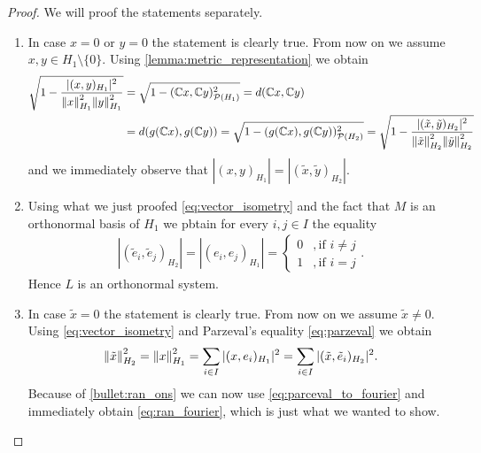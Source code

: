 \begin{proof}
	We will proof the statements separately.
	\begin{enumerate}
		\item In case $x = 0$ or $y = 0$ the statement is clearly true. From now on we assume $x,y \in H_1 \setminus \{0\}$. Using \ref{lemma:metric_representation} we obtain
		\begin{align*}
			\sqrt{1 - \dfrac{|(x,y)_{H_1}|^2}{\norm[H_1]{x}^2 \norm[H_1]{y}^2}} &= \sqrt{1 - (\C x,\C y)_{\mathcal{P}(H_1)}^2} = d(\C x,\C y) \\
			&= d\pbraces{g(\C x), g(\C y)} = \sqrt{1 - (g(\C x), g(\C y))_{\mathcal{P}(H_2)}^2} = \sqrt{1 - \dfrac{|(\tilde{x}, \tilde{y})_{H_2}|^2}{\norm[H_2]{\tilde{x}}^2 \norm[H_2]{\tilde{y}}^2}}
		\end{align*}
		and we immediately observe that $|(x,y)_{H_1}| = |(\tilde{x},\tilde{y})_{H_2}|$. 
		
		\item Using what we just proofed \eqref{eq:vector_isometry} and the fact that $M$ is an orthonormal basis of $H_1$ we pbtain for every $i,j \in I$ the equality
		\begin{align*}
			|(\tilde{e}_i, \tilde{e}_j)_{H_2}| = |(e_i, e_j)_{H_1}| = 
			\begin{cases}
				0 &, \text{if } i \neq j \\
				1 &, \text{if } i = j
			\end{cases}.
		\end{align*}
		Hence $L$ is an orthonormal system.
		
		\item In case $\tilde{x} = 0$ the statement is clearly true. From now on we assume $\tilde{x} \neq 0$. Using \eqref{eq:vector_isometry} and Parzeval's equality \eqref{eq:parzeval} we obtain
		\begin{align*}
			\norm[H_2]{\tilde{x}}^2 = \norm[H_1]{x}^2 = \sum_{i \in I} |(x, e_i)_{H_1}|^2 = \sum_{i \in I} |(\tilde{x}, \tilde{e}_i)_{H_2}|^2.
		\end{align*}
		Because of \ref{bullet:ran_ons} we can now use \eqref{eq:parceval_to_fourier} and immediately obtain \eqref{eq:ran_fourier}, which is just what we wanted to show.
	\end{enumerate}
\end{proof}